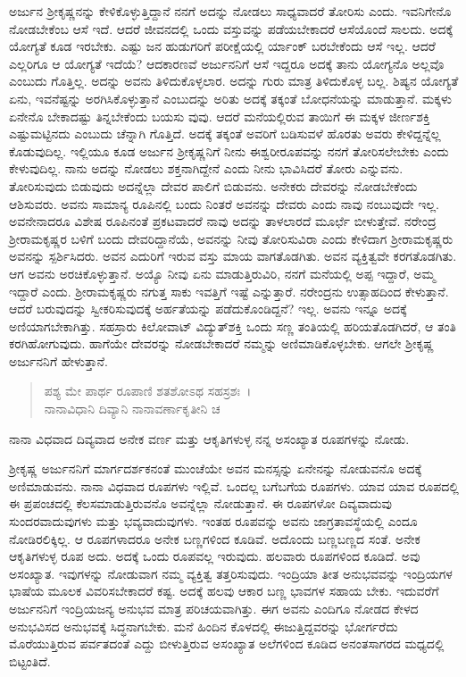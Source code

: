ಅರ್ಜುನ ಶ‍್ರೀಕೃಷ್ಣನನ್ನು ಕೇಳಿಕೊಳ್ಳುತ್ತಿದ್ದಾನೆ ನನಗೆ ಅದನ್ನು ನೋಡಲು ಸಾಧ್ಯವಾದರೆ ತೋರಿಸು ಎಂದು. ಇವನಿಗೇನೊ ನೋಡಬೇಕೆಂಬ ಆಸೆ ಇದೆ. ಆದರೆ ಜೀವನದಲ್ಲಿ ಒಂದು ವಸ್ತುವನ್ನು ಪಡೆಯಬೇಕಾದರೆ ಆಸೆಯೊಂದೆ ಸಾಲದು. ಅದಕ್ಕೆ ಯೋಗ್ಯತೆ ಕೂಡ ಇರಬೇಕು. ಎಷ್ಟು ಜನ ಹುಡುಗರಿಗೆ ಪರೀಕ್ಷೆಯಲ್ಲಿ ರ್ಯಾಂಕ್ ಬರಬೇಕೆಂದು ಆಸೆ ಇಲ್ಲ. ಆದರೆ ಎಲ್ಲರಿಗೂ ಆ ಯೋಗ್ಯತೆ ಇದೆಯೆ? ಆದಕಾರಣವೆ ಅರ್ಜುನನಿಗೆ ಆಸೆ ಇದ್ದರೂ ಅದಕ್ಕೆ ತಾನು ಯೋಗ್ಯನೊ ಅಲ್ಲವೊ ಎಂಬುದು ಗೊತ್ತಿಲ್ಲ. ಅದನ್ನು ಅವನು ತಿಳಿದುಕೊಳ್ಳಲಾರ. ಅದನ್ನು ಗುರು ಮಾತ್ರ ತಿಳಿದುಕೊಳ್ಳ ಬಲ್ಲ. ಶಿಷ್ಯನ ಯೋಗ್ಯತೆ ಏನು, ಇವನೆಷ್ಟನ್ನು ಅರಗಿಸಿಕೊಳ್ಳುತ್ತಾನೆ ಎಂಬುದನ್ನು ಅರಿತು ಅದಕ್ಕೆ ತಕ್ಕಂತೆ ಬೋಧನೆಯನ್ನು ಮಾಡುತ್ತಾನೆ. ಮಕ್ಕಳು ಏನೇನೊ ಬೇಕಾದಷ್ಟು ತಿನ್ನಬೇಕೆಂದು ಬಯಸು ವುವು. ಆದರೆ ಮನೆಯಲ್ಲಿರುವ ತಾಯಿಗೆ ಈ ಮಕ್ಕಳ ಜೀರ್ಣಶಕ್ತಿ ಎಷ್ಟುಮಟ್ಟಿನದು ಎಂಬುದು ಚೆನ್ನಾಗಿ ಗೊತ್ತಿದೆ. ಅದಕ್ಕೆ ತಕ್ಕಂತೆ ಅವರಿಗೆ ಬಡಿಸುವಳೆ ಹೊರತು ಅವರು ಕೇಳಿದ್ದನ್ನೆಲ್ಲ ಕೊಡುವುದಿಲ್ಲ. ಇಲ್ಲಿಯೂ ಕೂಡ ಅರ್ಜುನ ಶ‍್ರೀಕೃಷ್ಣನಿಗೆ ನೀನು ಈಶ್ವರೀರೂಪವನ್ನು ನನಗೆ ತೋರಿಸಲೇಬೇಕು ಎಂದು ಕೇಳುವುದಿಲ್ಲ. ನಾನು ಅದನ್ನು ನೋಡಲು ಶಕ್ತನಾಗಿದ್ದೇನೆ ಎಂದು ನೀನು ಭಾವಿಸಿದರೆ ತೋರು ಎನ್ನುವನು. ತೋರಿಸುವುದು ಬಿಡುವುದು ಅದನ್ನೆಲ್ಲಾ ದೇವರ ಪಾಲಿಗೆ ಬಿಡುವನು. ಅನೇಕರು ದೇವರನ್ನು ನೋಡಬೇಕೆಂದು ಆಶಿಸುವರು. ಅವನು ಸಾಮಾನ್ಯ ರೂಪಿನಲ್ಲಿ ಬಂದು ನಿಂತರೆ ಅವನನ್ನು ದೇವರು ಎಂದು ನಾವು ನಂಬುವುದೇ ಇಲ್ಲ. ಅವನೇನಾದರೂ ವಿಶೇಷ ರೂಪಿನಂತೆ ಪ್ರಕಟವಾದರೆ ನಾವು ಅದನ್ನು ತಾಳಲಾರದೆ ಮೂರ್ಛೆ ಬೀಳುತ್ತೇವೆ. ನರೇಂದ್ರ ಶ‍್ರೀರಾಮಕೃಷ್ಣರ ಬಳಿಗೆ ಬಂದು ದೇವರಿದ್ದಾನೆಯೆ, ಅವನನ್ನು ನೀವು ತೋರಿಸುವಿರಾ ಎಂದು ಕೇಳಿದಾಗ ಶ‍್ರೀರಾಮಕೃಷ್ಣರು ಅವನನ್ನು ಸ್ಪರ್ಶಿಸಿದರು. ಅವನ ಎದುರಿಗೆ ಇರುವ ವಸ್ತು ಮಾಯ ವಾಗತೊಡಗಿತು. ಅವನ ವ್ಯಕ್ತಿತ್ವವೇ ಕರಗತೊಡಗಿತು. ಆಗ ಅವನು ಅರಚಿಕೊಳ್ಳುತ್ತಾನೆ. ಅಯ್ಯೊ ನೀವು ಏನು ಮಾಡುತ್ತಿರುವಿರಿ, ನನಗೆ ಮನೆಯಲ್ಲಿ ಅಪ್ಪ ಇದ್ದಾರೆ, ಅಮ್ಮ ಇದ್ದಾರೆ ಎಂದು. ಶ‍್ರೀರಾಮಕೃಷ್ಣರು ನಗುತ್ತ ಸಾಕು ಇವತ್ತಿಗೆ ಇಷ್ಟೆ ಎನ್ನುತ್ತಾರೆ. ನರೇಂದ್ರನು ಉತ್ಸಾಹದಿಂದ ಕೇಳುತ್ತಾನೆ. ಆದರೆ ಬರುವುದನ್ನು ಸ್ವೀಕರಿಸುವುದಕ್ಕೆ ಅರ್ಹತೆಯನ್ನು ಪಡೆದುಕೊಂಡಿದ್ದನೆ? ಇಲ್ಲ. ಅವನು ಇನ್ನೂ ಅದಕ್ಕೆ ಅಣಿಯಾಗಬೇಕಾಗಿತ್ತು. ಸಹಸ್ರಾರು ಕಿಲೋವಾಟ್ ವಿದ್ಯುತ್​ಶಕ್ತಿ ಒಂದು ಸಣ್ಣ ತಂತಿಯಲ್ಲಿ ಹರಿಯತೊಡಗಿದರೆ, ಆ ತಂತಿ ಕರಗಿಹೋಗುವುದು. ಹಾಗೆಯೇ ದೇವರನ್ನು ನೋಡಬೇಕಾದರೆ ನಮ್ಮನ್ನು ಅಣಿಮಾಡಿಕೊಳ್ಳಬೇಕು. ಆಗಲೇ ಶ‍್ರೀಕೃಷ್ಣ ಅರ್ಜುನನಿಗೆ ಹೇಳುತ್ತಾನೆ.

\begin{verse}
ಪಶ್ಯ ಮೇ ಪಾರ್ಥ ರೂಪಾಣಿ ಶತಶೋಽಥ ಸಹಸ್ರಶಃ~।\\ನಾನಾವಿಧಾನಿ ದಿವ್ಯಾನಿ ನಾನಾವರ್ಣಾಕೃತೀನಿ ಚ 
\end{verse}

{\small ನಾನಾ ವಿಧವಾದ ದಿವ್ಯವಾದ ಅನೇಕ ವರ್ಣ ಮತ್ತು ಆಕೃತಿಗಳುಳ್ಳ ನನ್ನ ಅಸಂಖ್ಯಾತ ರೂಪಗಳನ್ನು ನೋಡು.}

ಶ‍್ರೀಕೃಷ್ಣ ಅರ್ಜುನನಿಗೆ ಮಾರ್ಗದರ್ಶಕನಂತೆ ಮುಂಚೆಯೇ ಅವನ ಮನಸ್ಸನ್ನು ಏನೇನನ್ನು ನೋಡುವನೊ ಅದಕ್ಕೆ ಅಣಿಮಾಡುವನು. ನಾನಾ ವಿಧವಾದ ರೂಪಗಳು ಇಲ್ಲಿವೆ. ಒಂದಲ್ಲ ಬಗೆಬಗೆಯ ರೂಪಗಳು. ಯಾವ ಯಾವ ರೂಪದಲ್ಲಿ ಈ ಪ್ರಪಂಚದಲ್ಲಿ ಕೆಲಸಮಾಡುತ್ತಿರುವನೊ ಅವನ್ನೆಲ್ಲಾ ನೋಡುತ್ತಾನೆ. ಈ ರೂಪಗಳೋ ದಿವ್ಯವಾದುವು ಸುಂದರವಾದುವುಗಳು ಮತ್ತು ಭವ್ಯವಾದುವುಗಳು. ಇಂತಹ ರೂಪವನ್ನು ಅವನು ಜಾಗ್ರತಾವಸ್ಥೆಯಲ್ಲಿ ಎಂದೂ ನೋಡಿರಲಿಕ್ಕಿಲ್ಲ. ಆ ರೂಪಗಳಾದರೂ ಅನೇಕ ಬಣ್ಣಗಳಿಂದ ಕೂಡಿವೆ. ಅದೊಂದು ಬಣ್ಣಬಣ್ಣದ ಸಂತೆ. ಅನೇಕ ಆಕೃತಿಗಳುಳ್ಳ ರೂಪ ಅದು. ಅದಕ್ಕೆ ಒಂದು ರೂಪವಲ್ಲ ಇರುವುದು. ಹಲವಾರು ರೂಪಗಳಿಂದ ಕೂಡಿದೆ. ಅವು ಅಸಂಖ್ಯಾತ. ಇವುಗಳನ್ನು ನೋಡುವಾಗ ನಮ್ಮ ವ್ಯಕ್ತಿತ್ವ ತತ್ತರಿಸುವುದು. ಇಂದ್ರಿಯಾ ತೀತ ಅನುಭವವನ್ನು ಇಂದ್ರಿಯಗಳ ಭಾಷೆಯ ಮೂಲಕ ವಿವರಿಸಬೇಕಾದರೆ ಕಷ್ಟ. ಅದಕ್ಕೆ ಹಲವು ಆಕಾರ ಬಣ್ಣ ಭಾವಗಳ ಸಹಾಯ ಬೇಕು. ಇದುವರೆಗೆ ಅರ್ಜುನನಿಗೆ ಇಂದ್ರಿಯಜನ್ಯ ಅನುಭವ ಮಾತ್ರ ಪರಿಚಯವಾಗಿತ್ತು. ಈಗ ಅವನು ಎಂದಿಗೂ ನೋಡದ ಕೇಳದ ಅನುಭವಿಸದ ಅನುಭವಕ್ಕೆ ಸಿದ್ಧನಾಗಬೇಕು. ಮನೆ ಹಿಂದಿನ ಕೊಳದಲ್ಲಿ ಈಜುತ್ತಿದ್ದವರನ್ನು ಭೋರ್ಗರೆದು ಮೊರೆಯುತ್ತಿರುವ ಪರ್ವತದಂತೆ ಎದ್ದು ಬೀಳುತ್ತಿರುವ ಅಸಂಖ್ಯಾತ ಅಲೆಗಳಿಂದ ಕೂಡಿದ ಅನಂತಸಾಗರದ ಮಧ್ಯದಲ್ಲಿ ಬಿಟ್ಟಂತಿದೆ.

